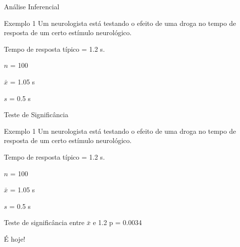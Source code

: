 \documentclass{beamer}
\begin{document}
\begin{frame}{\scriptsize Análise Inferencial}
  \begin{exampleblock}{Exemplo 1}
    \tiny
    Um neurologista está testando o efeito de uma droga no tempo de
    resposta de um certo estímulo neurológico.

    \smallskip
    Tempo de resposta típico = \alert<2->{1.2 s}.

    \smallskip
    $n$ = \alert{100}

    $\bar{x}$ = \alert{1.05 s}

    $s$ = \alert{0.5 s}

  \end{exampleblock}
\end{frame}

\begin{frame}{\scriptsize Teste de Significância}
  \begin{exampleblock}{Exemplo 1}
    \tiny
    Um neurologista está testando o efeito de uma droga no tempo de
    resposta de um certo estímulo neurológico.

    \smallskip
    Tempo de resposta típico = \alert{1.2 s}.

    \smallskip
    $n$ = \alert{100}

    $\bar{x}$ = \alert{1.05 s}

    $s$ = \alert{0.5 s}
  \end{exampleblock}
  \begin{exampleblock}{Teste de significância entre $\bar{x}$ e 1.2}
    \footnotesize
    p = 0.0034
  \end{exampleblock}
  \begin{center}
    \small
    É hoje!
  \end{center}
\end{frame}
\end{document}

